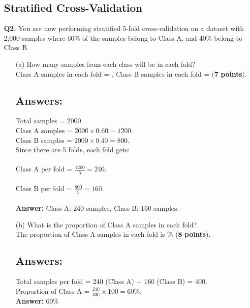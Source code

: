 \documentclass{article}
\begin{document}
\subsection*{Stratified Cross-Validation}
\textbf{Q2.} You are now performing stratified 5-fold cross-validation on a dataset
with 2,000 samples where 60\% of the samples belong to Class A, and 40\% belong to
Class B.
\begin{enumerate}
      \item[(a)] How many samples from each class will be in each fold? \\
            Class A samples in each fold = \underline{\hspace{3cm}}, Class B samples in
            each fold = \underline{\hspace{3cm}} (\textbf{7 points}).
            \subsection*{Answers:}
            Total samples = 2000. \\
            Class A samples = $2000 \times 0.60 = 1200$. \\
            Class B samples = $2000 \times 0.40 = 800$. \\
            Since there are 5 folds, each fold gets: \\\\
            Class A per fold = $\frac{1200}{5} = 240$. \\\\
            Class B per fold = $\frac{800}{5} = 160$. \\\\
            \textbf{Answer:} Class A: 240 samples, Class B: 160 samples.
      \item[(b)] What is the proportion of Class A samples in each fold? \\
            The proportion of Class A samples in each fold is \underline{\hspace{3cm}} \%
            (\textbf{8 points}).
            \subsection*{Answers:}
            Total samples per fold = 240 (Class A) + 160 (Class B) = 400. \\
            Proportion of Class A = $\frac{240}{400} \times 100 = 60\%$. \\
            \textbf{Answer:} 60\%
\end{enumerate}
\end{document}
